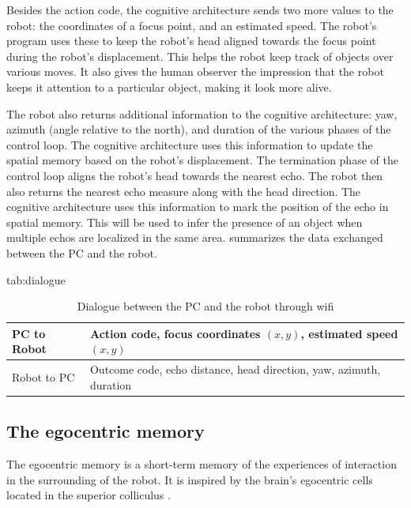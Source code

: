 \documentclass[pmlr]{jmlr}%
\begin{document}
Besides the action code, the cognitive architecture sends two more values to the robot: the coordinates of a focus point, and an estimated speed. 
The robot's program uses these to keep the robot's head aligned towards the focus point during the robot's displacement. 
This helps the robot keep track of objects over various moves. 
It also gives the human observer the impression that the robot keeps it attention to a particular object, making it look more alive. 

The robot also returns additional information to the cognitive architecture: yaw, azimuth (angle relative to the north), and duration of the various phases of the control loop. 
The cognitive architecture uses this information to update the spatial memory based on the robot's displacement. 
The termination phase of the control loop aligns the robot's head towards the nearest echo. 
The robot then also returns the nearest echo measure along with the head direction. 
The cognitive architecture uses this information to mark the position of the echo in spatial memory. 
This will be used to infer the presence of an object when multiple echos are localized in the same area. 
 summarizes the data exchanged between the PC and the robot.

\begin{table}[htbp]
	\floatconts
	{tab:dialogue}%
	{\caption{Dialogue between the PC and the robot through wifi}}%
	{\begin{tabular}{l|l}
			\toprule
			PC to Robot & Action code, focus coordinates $(x, y)$, estimated speed $(x, y)$\\
			\midrule
			Robot to PC & Outcome code, echo distance, head direction, yaw, azimuth, duration\\
			\bottomrule
	\end{tabular}}
\end{table}

\subsection{The egocentric memory}

The egocentric memory is a short-term memory of the experiences of interaction in the surrounding of the robot. 
It is inspired by the brain's egocentric cells located in the superior colliculus \citep{grieves_representation_2017}.
\end{document}
